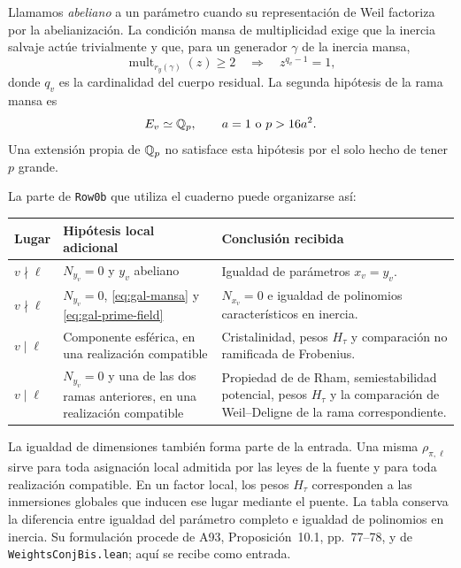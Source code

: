 Llamamos \emph{abeliano} a un parámetro cuando su representación
de Weil factoriza por la abelianización. La condición mansa
de multiplicidad exige que la inercia salvaje actúe trivialmente y que,
para un generador $\gamma$ de la inercia mansa,
\begin{equation}
 \operatorname{mult}_{r_y(\gamma)}(z)\ge2
 \quad\Longrightarrow\quad z^{q_v-1}=1,
 \label{eq:gal-mansa}
\end{equation}
donde $q_v$ es la cardinalidad del cuerpo residual.
La segunda hipótesis de la rama mansa es
\begin{equation}
 E_v\simeq\Q_p,\qquad a=1\ \text{o}\ p>16a^2.
 \label{eq:gal-prime-field}
\end{equation}
Una extensión propia de $\mathbb{Q}_p$ no satisface esta hipótesis
por el solo hecho de tener $p$ grande.

La parte de \texttt{Row0b} que utiliza el cuaderno puede organizarse así:
\begin{center}
\small
\begin{tabularx}{\textwidth}{@{}p{}YY@{}}
\toprule
Lugar & Hipótesis local adicional & Conclusión recibida\\
\midrule
$v\nmid\ell$ &
$N_{y_v}=0$ y $y_v$ abeliano &
Igualdad de parámetros $x_v=y_v$.\\
$v\nmid\ell$ &
$N_{y_v}=0$, \eqref{eq:gal-mansa} y \eqref{eq:gal-prime-field} &
$N_{x_v}=0$ e igualdad de polinomios característicos en inercia.\\
$v\mid\ell$ &
Componente esférica, en una realización compatible &
Cristalinidad, pesos $H_\tau$ y comparación no ramificada de Frobenius.\\
$v\mid\ell$ &
$N_{y_v}=0$ y una de las dos ramas anteriores, en una realización compatible &
Propiedad de de Rham, semiestabilidad potencial, pesos $H_\tau$
y la comparación de Weil--Deligne de la rama correspondiente.\\
\bottomrule
\end{tabularx}
\end{center}
La igualdad de dimensiones también forma parte de la entrada.
Una misma $\rho_{\pi,\ell}$ sirve para toda asignación local
admitida por las leyes de la fuente y para toda realización
compatible. En un factor local, los pesos $H_\tau$ corresponden
a las inmersiones globales que inducen ese lugar mediante el puente.
La tabla conserva la diferencia entre igualdad del parámetro completo
e igualdad de polinomios en inercia. Su formulación procede de
A93, Proposición~10.1, pp.~77--78, y de
\texttt{WeightsConjBis.lean}; aquí se recibe como entrada.

